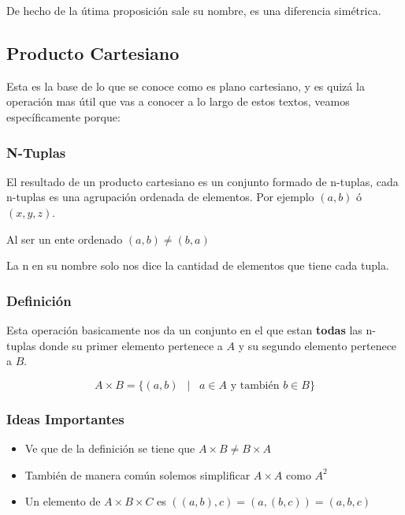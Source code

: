 \documentclass[12pt]{report}                                    %
\DeclareMathOperator \Space {\quad}                             %
\DeclareMathOperator \MiniSpace {\;}                            %
\newcommand \Such {\MiniSpace|\MiniSpace}                       %
\begin{document}
            De hecho de la útima proposición sale su nombre, es una diferencia simétrica.


        \clearpage
        \subsection{Producto Cartesiano}

            Esta es la base de lo que se conoce como es plano cartesiano, y es quizá
            la operación mas útil que vas a conocer a lo largo de estos textos,
            veamos específicamente porque:

            \subsubsection*{N-Tuplas}

                El resultado de un producto cartesiano es un conjunto formado de n-tuplas,
                cada n-tuplas es una agrupación ordenada de elementos.
                Por ejemplo $(a,b)$ ó $(x,y,z)$.

                Al ser un ente ordenado $(a,b) \neq (b,a)$

                La n en su nombre solo nos dice la cantidad de elementos que tiene cada tupla.


            \subsubsection*{Definición}

                Esta operación basicamente nos da un conjunto en el que estan \textbf{todas} las n-tuplas
                donde su primer elemento pertenece a $A$ y su segundo elemento pertenece a $B$.

                \begin{equation}
                    A \times B = \{ (a, b) \Such a \in A \text{ y también } b \in B \}
                \end{equation}

            \subsubsection*{Ideas Importantes}

            \begin{itemize}
                \item Ve que de la definición se tiene que $ A \times B \neq B \times A$

                \item También de manera común solemos simplificar $A \times A$ como $A^2$

                \item Un elemento de $A \times B \times C$ es $((a,b),c) = (a,(b,c)) = (a,b,c)$
            \end{itemize}
\end{document}
